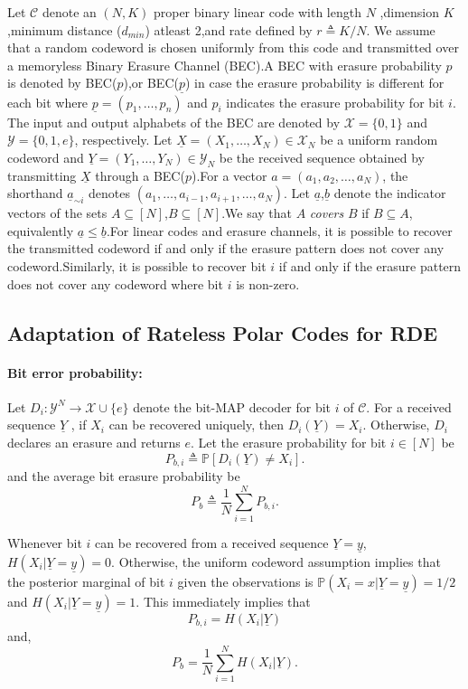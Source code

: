 \documentclass[
11pt, %
a4paper, %
oneside, %
headinclude,footinclude, %
BCOR5mm, %
]{scrartcl}
\begin{document}
Let $\mathcal{C}$ denote an $(N, K)$ proper binary linear code with length $N$ ,dimension $K$ ,minimum distance ($d_{min}$) atleast 2,and rate defined by $r \triangleq K/N$. We assume that a random codeword is chosen uniformly from this code and transmitted over a memoryless Binary Erasure Channel (BEC).A BEC with erasure probability $p$ is denoted by BEC($p$),or BEC($\underline{p}$) in case the erasure probability is different for each bit where $\underline{p} = (p_1 , \ldots , p_n)$ and
$p_i$ indicates the erasure probability for bit $i$.
The input and output alphabets of the BEC are denoted by $\mathcal{X} = \{0, 1\}$ and $\mathcal{Y} = \{0, 1, e\}$, respectively. Let $\underline{X} = (X_1 , \ldots , X_N) \in \mathcal{X}_N$ be a uniform random codeword and
$\underline{Y} = (Y_1 , \ldots, Y_N) \in \mathcal{Y}_N$ be the received sequence obtained by transmitting $\underline{X}$ through a BEC($p$).For a vector $a = (a_1 , a_2 , \ldots , a_N)$, the shorthand $\underline{a}_{\sim i}$ denotes
$(a_1 , \ldots , a_{i-1} , a_{i+1}, \ldots , a_N)$.
Let $\underline{a}$,$\underline{b}$ denote the indicator vectors of the sets $A \subseteq [N]$,$B \subseteq [N]$.We say that $A$ \emph{covers} $B$ if $B \subseteq A$, equivalently  $\underline{a}\leq\underline{b}$.For linear codes and erasure channels, it is possible to recover the transmitted codeword if and only if the erasure
pattern does not cover any codeword.Similarly,
it is possible to recover bit $i$ if and only if the erasure
pattern does not cover any codeword where bit $i$ is non-zero.


\subsection{Adaptation of Rateless Polar Codes for RDE} 
\paragraph*{Bit error probability:}Let $D_i : \mathcal{Y}^N \to \mathcal{X} \cup \{e\}$ denote the bit-MAP decoder for bit $i$ of $\mathcal{C}$. For a received sequence $\underline{Y}$ , if $X_i$ can be recovered uniquely, then $D_i(\underline{Y}) = X_i$. Otherwise, $D_i$ declares an erasure and returns $e$. Let the erasure probability for bit $i \in [N]$ be $$P_{b,i} \triangleq \mathbb{P}[D_i(\underline{Y}) \neq X_i].$$ and the average bit erasure probability be $$P_b \triangleq \frac{1}{N}\sum_{i=1}^N P_{b,i}.$$

Whenever bit $i$ can be recovered from a received sequence $\underline{Y}=\underline{y}$, $H(X_i | \underline{Y}=\underline{y}) = 0$. Otherwise, the uniform codeword assumption implies that the posterior marginal of bit $i$ given the observations is $\mathbb{P}(X_i = x|\underline{Y}=\underline{y}) = 1/2$ and $H(X_i |\underline{Y}=\underline{y}) = 1$. This immediately implies that $$P_{b,i} = H(X_i|\underline{Y})$$ and, $$P_b = \frac{1}{N}\sum_{i=1}^N  H(X_i|\underline{Y}).$$
\end{document}

